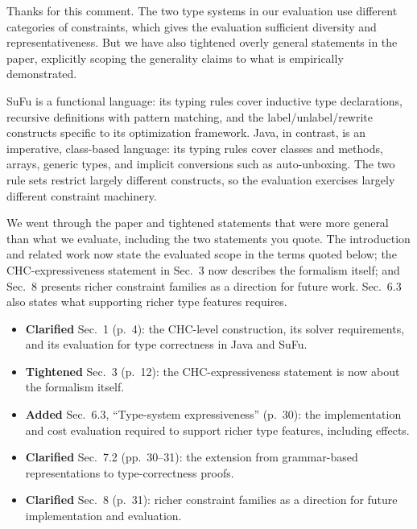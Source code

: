 \documentclass[11pt,a4paper]{article}
\newcommand{\response}{\par\medskip\needspace{3\baselineskip}\noindent{\bfseries\color{accent}Response.}%
  \par\nopagebreak\smallskip\ignorespaces}
\newcommand{\changesmade}[1]{\par\medskip\needspace{4\baselineskip}\noindent{\bfseries\color{accent}Changes made.}%
  \par\nopagebreak\smallskip#1\par}
\begin{document}
\response Thanks for this comment. The two type systems in our evaluation use different categories of constraints, which gives the evaluation sufficient diversity and representativeness. But we have also tightened overly general statements in the paper, explicitly scoping the generality claims to what is
empirically demonstrated.

SuFu is a functional language: its typing rules cover inductive type declarations, recursive definitions with pattern matching, and the label/unlabel/rewrite constructs specific to its optimization framework. Java, in contrast, is an imperative, class-based language: its typing rules cover classes and methods, arrays, generic types, and implicit conversions such as auto-unboxing. The two rule sets restrict largely different constructs, so the evaluation exercises largely different constraint machinery.

We went through the paper and tightened statements that were more general than what we evaluate, including the two statements you quote. The introduction and related work now state the evaluated scope in the terms quoted below; the CHC-expressiveness statement in Sec.~3 now describes the formalism itself; and Sec.~8 presents richer constraint families as a direction for future work. Sec.~6.3 also states what supporting richer type features requires. 

\changesmade{\begin{itemize}[leftmargin=1.2em,itemsep=1pt,topsep=2pt]
  \item \textbf{Clarified} Sec.~1 (p.~4): the CHC-level construction, its solver requirements, and its evaluation for type correctness in Java and SuFu.
  \item \textbf{Tightened} Sec.~3 (p.~12): the CHC-expressiveness statement is now about the formalism itself.
  \item \textbf{Added} Sec.~6.3, ``Type-system expressiveness'' (p.~30): the implementation and cost evaluation required to support richer type features, including effects.
  \item \textbf{Clarified} Sec.~7.2 (pp.~30--31): the extension from grammar-based representations to type-correctness proofs.
  \item \textbf{Clarified} Sec.~8 (p.~31): richer constraint families as a direction for future implementation and evaluation.
\end{itemize}}
\end{document}

